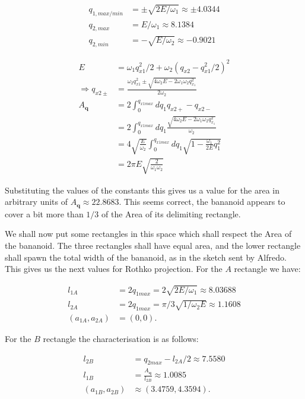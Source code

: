 \documentclass[a4paper,12pt]{article}
\newcommand{\qfase}{\mathbf{q}}
\begin{document}
\begin{align}
q_{1,max/min} & =\pm \sqrt{2E/\omega_1} \approx \pm 4.0344\\
q_{2,max} & = E/\omega_1 \approx 8.1384\\ 
q_{2,min} & = -\sqrt{E/\omega_2} \approx -0.9021
\end{align}


\begin{align}
E &=\omega_1 q_{x1}^2/2+\omega_2 (q_{x2}- q_{x1}^2/2)^2\\
\Rightarrow q_{x2\pm} & = \frac{\omega_2 q_{x1}^2\pm \sqrt{4 \omega_2 E -2 \omega_1\omega_2 q_{x_1}^2}} 
{2\omega_2 } \\
A_\qfase & =2 \int_{0}^{q_{x1max}} d q_1  q_{x2+}-q_{x2-} \\
& = 2 \int_{0}^{q_{x1max}} d q_1  \frac{\sqrt{4 \omega_2 E -2 \omega_1\omega_2 q_{x_1}^2}} {\omega_2} \\
&=  4 \sqrt{\frac{ E} {\omega_2}} \int_{0}^{q_{x1max}} d q_1 
\sqrt{1-\frac{\omega_1}{2E} q_1^2 } \\
&= 2\pi  E\sqrt{\frac{2}{\omega_1\omega_2} }
\end{align}

Substituting the values of the constants this gives us a value
for the area in arbitrary units of $A_\qfase\approx 22.8683$. This
seems correct, the bananoid appears to cover a bit more than
$1/3$ of the Area of its delimiting rectangle. 

We shall now put some rectangles in this space
which shall respect the Area of the bananoid. The three rectangles
shall have equal area, and the lower rectangle shall spawn the 
total width of the bananoid, as in the sketch sent by Alfredo. This gives us
the next values for Rothko projection. For the $A$ rectangle we have:

\begin{align}
l_{1A} &= 2 q_{1max}= 2 \sqrt{2 E/ \omega_1} \approx 8.03688 \\
l_{2A} &= 2 q_{1max}= \pi/3 \sqrt{1/ \omega_2 E} \approx 1.1608 \\
(a_{1A} ,a_{2A}) & = (0, 0). 
\end{align}

For the $B$ rectangle the characterisation is as follows:

\begin{align}
l_{2B} &= q_{2max}-l_{2A}/2 \approx 7.5580 \\
l_{1B} &=\frac{A_\qfase} {l_{2B}} \approx 1.0085 \\ 
(a_{1B} , a_{2B}) & \approx  (3.4759, 4.3594). 
\end{align}
\end{document}
